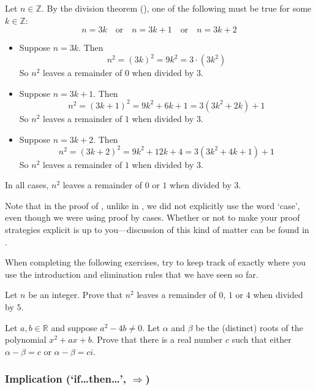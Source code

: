 \begin{cproof}
Let $n \in \mathbb{Z}$. By the division theorem (), one of the following must be true for some $k \in \mathbb{Z}$:
\[
n=3k \quad \text{or} \quad n=3k+1 \quad \text{or} \quad n=3k+2
\]
\begin{itemize}
\item Suppose $n=3k$. Then
\[
n^2 = (3k)^2 = 9k^2 = 3 \cdot (3k^2)
\]
So $n^2$ leaves a remainder of $0$ when divided by $3$.
\item Suppose $n=3k+1$. Then
\[
n^2 = (3k+1)^2 = 9k^2+6k+1 = 3(3k^2+2k)+1
\]
So $n^2$ leaves a remainder of $1$ when divided by $3$.
\item Suppose $n=3k+2$. Then
\[
n^2 = (3k+2)^2 = 9k^2+12k+4 = 3(3k^2+4k+1)+1
\]
So $n^2$ leaves a remainder of $1$ when divided by $3$.
\end{itemize}
In all cases, $n^2$ leaves a remainder of $0$ or $1$ when divided by $3$.
\end{cproof}

Note that in the proof of , unlike in , we did not explicitly use the word `case', even though we were using proof by cases. Whether or not to make your proof strategies explicit is up to you---discussion of this kind of matter can be found in .

When completing the following exercises, try to keep track of exactly where you use the introduction and elimination rules that we have seen so far.

\begin{exercise}
Let $n$ be an integer. Prove that $n^2$ leaves a remainder of $0$, $1$ or $4$ when divided by $5$.
\end{exercise}

\begin{exercise}
Let $a,b \in \mathbb{R}$ and suppose $a^2-4b \ne 0$. Let $\alpha$ and $\beta$ be the (distinct) roots of the polynomial $x^2+ax+b$. Prove that there is a real number $c$ such that either $\alpha-\beta = c$ or $\alpha - \beta = ci$.
\end{exercise}

\subsubsection*{Implication (`if\dots{}then\dots{}', $\Rightarrow$)}

